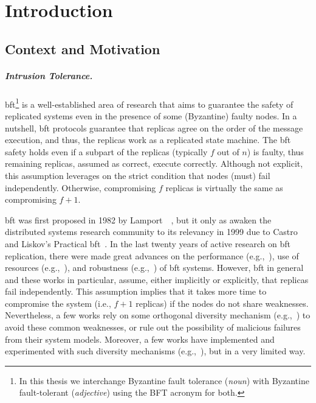 \chapter{Introduction}
\label{chap:introduction}

\section{Context and Motivation}
\paragraph{Intrusion Tolerance.}
\gls{bft}\footnote{In this thesis we interchange Byzantine fault tolerance (\emph{noun}) with Byzantine fault-tolerant (\emph{adjective}) using the BFT acronym for both.} is a well-established area of research that aims to guarantee the safety of replicated systems even in the presence of some (Byzantine) faulty nodes.
In a nutshell, \gls{bft} protocols guarantee that replicas agree on the order of the message execution, and thus, the replicas work as a replicated state machine.
The \gls{bft} safety holds even if a subpart of the replicas (typically $f$ out of $n$) is faulty, thus remaining replicas, assumed as correct, execute correctly.
Although not explicit, this assumption leverages on the strict condition that nodes (must) fail independently.
Otherwise, compromising $f$ replicas is virtually the same as compromising $f+1$.


\gls{bft} was first proposed in 1982 by Lamport~\etal{}~\cite{Lamport:1982}, but it only as awaken the distributed systems research community to its relevancy in 1999 due to Castro and Liskov's Practical \gls{bft}~\cite{Castro:1999}. 
In the last twenty years of active research on \gls{bft} replication, there were made great advances on the performance (e.g.,~\cite{Kotla:2010,Aublin:2015,Behl:2015}), use of resources (e.g.,~\cite{Yin:2003,Wood:2011,Veronese:2013,Liu:2016,Behl:2017}), and robustness (e.g.,~\cite{Amir:2011,Bessani:2014,Clement:2009b}) of \gls{bft} systems.
However, \gls{bft} in general and these works in particular, assume, either implicitly or explicitly, that replicas fail independently. 
This assumption implies that it takes more time to compromise the system (i.e., $f+1$ replicas) if the nodes do not share weaknesses. 
Nevertheless, a few works rely on some orthogonal diversity mechanism (e.g.,~\cite{Roeder:2010,Avizienis:1995}) to avoid these common weaknesses, or rule out the possibility of malicious failures from their system models.
Moreover, a few works have implemented and experimented with such diversity mechanisms (e.g.,~\cite{Castro:2003,Roeder:2010,Amir:2011}), but in a very limited way.


